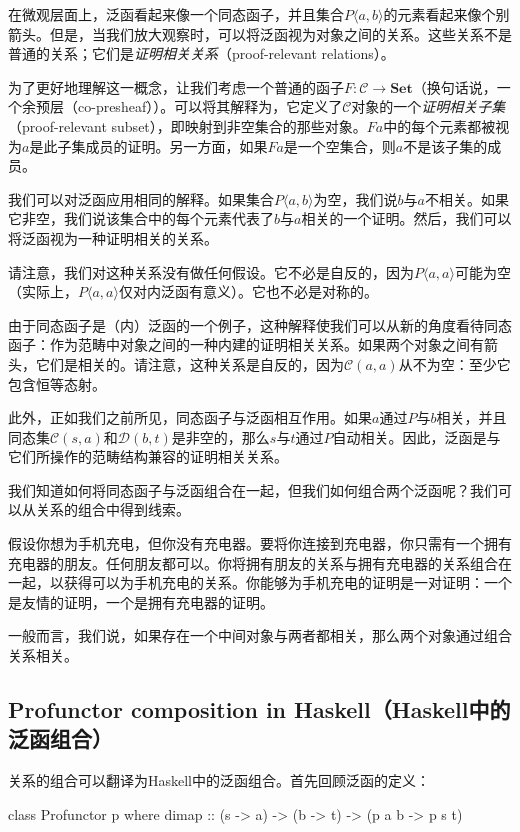\documentclass[DaoFP]{subfiles}
\begin{document}
 在微观层面上，泛函看起来像一个同态函子，并且集合$P \langle a, b \rangle$的元素看起来像个别箭头。但是，当我们放大观察时，可以将泛函视为对象之间的关系。这些关系不是普通的关系；它们是\emph{证明相关关系}（proof-relevant relations）。

 为了更好地理解这一概念，让我们考虑一个普通的函子$F \colon \mathcal{C} \to \mathbf{Set}$（换句话说，一个余预层（co-presheaf））。可以将其解释为，它定义了$\mathcal{C}$对象的一个\emph{证明相关子集}（proof-relevant subset），即映射到非空集合的那些对象。$F a$中的每个元素都被视为$a$是此子集成员的证明。另一方面，如果$F a$是一个空集合，则$a$不是该子集的成员。

 我们可以对泛函应用相同的解释。如果集合$P \langle a, b \rangle$为空，我们说$b$与$a$不相关。如果它非空，我们说该集合中的每个元素代表了$b$与$a$相关的一个证明。然后，我们可以将泛函视为一种证明相关的关系。

 请注意，我们对这种关系没有做任何假设。它不必是自反的，因为$P \langle a, a \rangle$可能为空（实际上，$P \langle a, a \rangle$仅对内泛函有意义）。它也不必是对称的。

 由于同态函子是（内）泛函的一个例子，这种解释使我们可以从新的角度看待同态函子：作为范畴中对象之间的一种内建的证明相关关系。如果两个对象之间有箭头，它们是相关的。请注意，这种关系是自反的，因为$\mathcal{C}(a, a)$从不为空：至少它包含恒等态射。

 此外，正如我们之前所见，同态函子与泛函相互作用。如果$a$通过$P$与$b$相关，并且同态集$\mathcal{C}(s, a)$和$\mathcal{D}(b, t)$是非空的，那么$s$与$t$通过$P$自动相关。因此，泛函是与它们所操作的范畴结构兼容的证明相关关系。

 我们知道如何将同态函子与泛函组合在一起，但我们如何组合两个泛函呢？我们可以从关系的组合中得到线索。

 假设你想为手机充电，但你没有充电器。要将你连接到充电器，你只需有一个拥有充电器的朋友。任何朋友都可以。你将拥有朋友的关系与拥有充电器的关系组合在一起，以获得可以为手机充电的关系。你能够为手机充电的证明是一对证明：一个是友情的证明，一个是拥有充电器的证明。

 一般而言，我们说，如果存在一个中间对象与两者都相关，那么两个对象通过组合关系相关。

 \subsection{Profunctor composition in Haskell（Haskell中的泛函组合）}

 关系的组合可以翻译为Haskell中的泛函组合。首先回顾泛函的定义：
 \begin{haskell}
  class Profunctor p where
  dimap :: (s -> a) -> (b -> t) -> (p a b -> p s t)
 \end{haskell}
\end{document}
